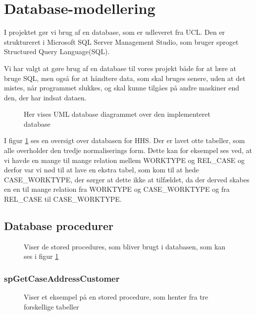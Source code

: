 \section{Database-modellering}\label{databasemodellering}

I projektet gør vi brug af en database, som er udleveret fra UCL. Den er struktureret i Microsoft SQL Server Management Studio, som bruger sproget Structured Query Language(SQL).



Vi har valgt at gøre brug af en database til vores projekt både for at lære at bruge SQL, men også for at håndtere data, som skal bruges senere, uden at det mistes, når programmet slukkes, og skal kunne tilgåes på andre maskiner end den, der har indsat dataen.

\begin{figure}[H]
    \caption{Her vises UML database diagrammet over den implementeret database}
    \label{fig:DatabaseDiagram}
\end{figure}

I figur \ref{fig:DatabaseDiagram} ses en oversigt over databasen for HHS.
Der er lavet otte tabeller, som alle overholder den tredje normaliserings form. \cite{Database}
Dette kan for eksempel ses ved, at vi havde en mange til mange relation mellem WORKTYPE og REL\_CASE og derfor var vi nød til at lave en ekstra tabel, som kom til at hede CASE\_WORKTYPE, der sørger at dette ikke at tilfældet, da der derved skabes en en til mange relation fra WORKTYPE og CASE\_WORKTYPE og fra REL\_CASE til CASE\_WORKTYPE.

\subsection{Database procedurer}

\begin{figure}[h]
    \caption{Viser de stored procedures, som bliver brugt i databasen, som kan ses i figur \ref{fig:DatabaseDiagram}}
    \label{fig:SP}
\end{figure}

\subsubsection{spGetCaseAddressCustomer}\label{spaddress}
\begin{figure}[H]
    \caption{Viser et eksempel på en stored procedure, som henter fra tre forskellige tabeller}
    \label{fig:SPADRRESCUSTOMER}
\end{figure}

